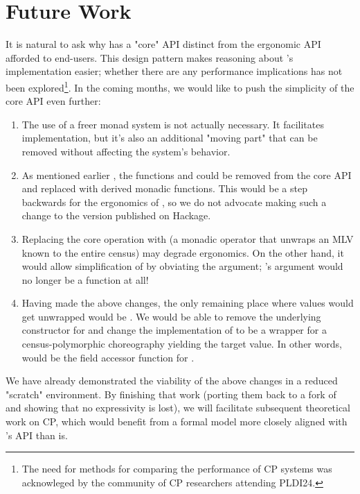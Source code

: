 \section{Future Work}
\label{sec:future-implementation}
It is natural to ask why \MultiChor has a "core" API distinct from the ergonomic API afforded to end-users.
This design pattern makes reasoning about \MultiChor's implementation easier;
whether there are any performance implications has not been explored\footnote{
  The need for methods for comparing the performance of CP systems was acknowleged by the community
  of CP researchers attending PLDI24.
}.
In the coming months, we would like to push the simplicity of the core API even further:
\begin{enumerate}
  \item The use of a freer monad system is not actually necessary.
        It facilitates implementation, but it's also an additional "moving part" that can be removed
        without affecting the system's behavior.
  \item As mentioned earlier , the functions  and 
        could be removed from the core API and replaced with derived monadic functions.
        This would be a step backwards for the ergonomics of \MultiChor,
        so we do not advocate making such a change to the version published on Hackage.
  \item Replacing the core operation  with 
        (a monadic operator that unwraps an MLV known to the entire census)
        may degrade ergonomics.
        On the other hand, it would allow simplification of 
        by obviating the  argument;
        \ie {}'s argument would no longer be a function at all!
  \item Having made the above changes, the only remaining place where  values would get unwrapped
        would be .
        We would be able to remove the underlying  constructor for 
        and change the implementation of  to be a  wrapper for
        a census-polymorphic choreography yielding the target value.
        In other words,  would be the field accessor function for .
\end{enumerate}

We have already demonstrated the viability of the above changes in a reduced "scratch" environment.
By finishing that work (porting them back to a fork of \MultiChor and showing that no expressivity is lost),
we will facilitate subsequent theoretical work on CP, which would benefit from a formal model more closely aligned with
\MultiChor's API than \HLSCentral is.



